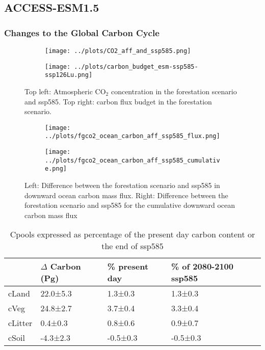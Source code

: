 \documentclass[]{article}
\begin{document}
\subsection{ACCESS-ESM1.5}

\subsubsection{Changes to the Global Carbon Cycle}

\begin{figure}[H]
    \centering
    \begin{subfigure}[b]{0.4\linewidth}
        \texttt{[image: ../plots/CO2\_aff\_and\_ssp585.png]}
    \end{subfigure}
    \begin{subfigure}[b]{0.4\linewidth}
        \texttt{[image: ../plots/carbon\_budget\_esm-ssp585-ssp126Lu.png]}
    \end{subfigure}
    \caption{Top left: Atmospheric CO$_2$ concentration in the forestation scenario and ssp585. Top right: carbon flux budget in the forestation scenario.}
    \label{fig:atmosphere_carbon}
\end{figure}

\begin{figure}[H]
    \centering
    \begin{subfigure}[b]{0.4\linewidth}
        \texttt{[image: ../plots/fgco2\_ocean\_carbon\_aff\_ssp585\_flux.png]}
    \end{subfigure}
    \begin{subfigure}[b]{0.4\linewidth}
        \texttt{[image: ../plots/fgco2\_ocean\_carbon\_aff\_ssp585\_cumulative.png]}
    \end{subfigure}
    \caption{Left: Difference between the forestation scenario and ssp585 in downward ocean carbon mass flux. Right: Difference between the forestation scenario and ssp585 for the cumulative downward ocean carbon mass flux}
    \label{fig:ocean_carbon}
\end{figure}

\begin{table}[H]
    \centering
    \begin{tabular}{@{}llll@{}}
    \hline
        & $\Delta$ Carbon (Pg) & \% present day & \% of 2080-2100 ssp585 \\ \hline
cLand   & 22.0±5.3    & 1.3±0.3        & 1.3±0.3                \\
cVeg    & 24.8±2.7    & 3.7±0.4        & 3.3±0.4                \\
cLitter & 0.4±0.3     & 0.8±0.6        & 0.9±0.7                \\
cSoil   & -4.3±2.3    & -0.5±0.3       & -0.5±0.3               \\ \hline
    \end{tabular}
    \caption{Cpools expressed as percentage of the present day carbon content or the end of ssp585}
    \label{tab:cpools_table}
\end{table}
\end{document}
